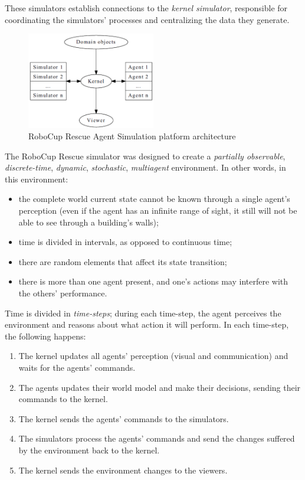 \documentclass{article}
\begin{document}
These simulators establish connections to the \emph{kernel simulator}, responsible for coordinating the simulators' processes and centralizing the data they generate.

\begin{figure}[ht]
  \centering
  \includegraphics[width=0.5\textwidth]{figs/simulator_architecture}
  \caption{RoboCup Rescue Agent Simulation platform architecture~\cite{skinnerRamchurn2010}}
  \label{fig:simulator_architecture}
\end{figure}

The RoboCup Rescue simulator was designed to create a \emph{partially observable}, \emph{discrete-time}, \emph{dynamic}, \emph{stochastic}, \emph{multiagent} environment. In other words, in this environment:

\begin{itemize}
  \item the complete world current state cannot be known through a single agent's perception (even if the agent has an infinite range of sight, it still will not be able to see through a building's walls);
  \item time is divided in intervals, as opposed to continuous time;
  \item there are random elements that affect its state transition;
  \item there is more than one agent present, and one's actions may interfere with the others' performance.
\end{itemize}

Time is divided in \emph{time-steps}; during each time-step, the agent perceives the environment and reasons about what action it will perform. In each time-step, the following happens:
\begin{enumerate}
\label{enum:time-step}
  \item The kernel updates all agents' perception (visual and communication) and waits for the agents' commands.
  \item The agents updates their world model and make their decisions, sending their commands to the kernel.
  \item The kernel sends the agents' commands to the simulators.
  \item The simulators process the agents' commands and send the changes suffered by the environment back to the kernel.
  \item The kernel sends the environment changes to the viewers.
\end{enumerate}
\end{document}
